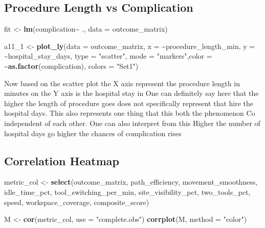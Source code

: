 \documentclass[
]{article}
\newenvironment{Shaded}{\begin{snugshade}}{\end{snugshade}}
\newcommand{\AttributeTok}[1]{\textcolor[rgb]{0.13,0.29,0.53}{#1}}
\newcommand{\FunctionTok}[1]{\textcolor[rgb]{0.13,0.29,0.53}{\textbf{#1}}}
\newcommand{\NormalTok}[1]{#1}
\newcommand{\OtherTok}[1]{\textcolor[rgb]{0.56,0.35,0.01}{#1}}
\newcommand{\SpecialCharTok}[1]{\textcolor[rgb]{0.81,0.36,0.00}{\textbf{#1}}}
\newcommand{\StringTok}[1]{\textcolor[rgb]{0.31,0.60,0.02}{#1}}
\begin{document}
\subsection{Procedure Length vs
Complication}\label{procedure-length-vs-complication}

\begin{Shaded}
\begin{Highlighting}[]
\NormalTok{fit }\OtherTok{\textless{}{-}} \FunctionTok{lm}\NormalTok{(complication}\SpecialCharTok{\textasciitilde{}}\NormalTok{ ., }\AttributeTok{data =}\NormalTok{ outcome\_matrix)}

\NormalTok{a11\_1 }\OtherTok{\textless{}{-}} \FunctionTok{plot\_ly}\NormalTok{(}\AttributeTok{data =}\NormalTok{ outcome\_matrix, }\AttributeTok{x =} \SpecialCharTok{\textasciitilde{}}\NormalTok{procedure\_length\_min, }\AttributeTok{y =} \SpecialCharTok{\textasciitilde{}}\NormalTok{hospital\_stay\_days, }\AttributeTok{type =} \StringTok{"scatter"}\NormalTok{, }\AttributeTok{mode =} \StringTok{"markers"}\NormalTok{,}\AttributeTok{color =} \SpecialCharTok{\textasciitilde{}}\FunctionTok{as.factor}\NormalTok{(complication), }\AttributeTok{colors =} \StringTok{"Set1"}\NormalTok{)}
\end{Highlighting}
\end{Shaded}

Now based on the scatter plot the X axis represent the procedure length
in minutes on the Y axis is the hospital stay in One can definitely say
here that the higher the length of procedure goes does not specifically
represent that hire the hospital days. This also represents one thing
that this both the phenomenon Co independent of each other. One can also
interpret from this Higher the number of hospital days go higher the
chances of complication rises

\subsection{Correlation Heatmap}\label{correlation-heatmap}

\begin{Shaded}
\begin{Highlighting}[]
\NormalTok{metric\_col }\OtherTok{\textless{}{-}} \FunctionTok{select}\NormalTok{(outcome\_matrix,}
\NormalTok{                     path\_efficiency,}
\NormalTok{                     movement\_smoothness,}
\NormalTok{                     idle\_time\_pct,}
\NormalTok{                     tool\_switching\_per\_min,}
\NormalTok{                     site\_visibility\_pct,}
\NormalTok{                     two\_tools\_pct,}
\NormalTok{                     speed,}
\NormalTok{                     workspace\_coverage,}
\NormalTok{                     composite\_score)}

\NormalTok{M }\OtherTok{\textless{}{-}} \FunctionTok{cor}\NormalTok{(metric\_col, }\AttributeTok{use =} \StringTok{"complete.obs"}\NormalTok{)}
\FunctionTok{corrplot}\NormalTok{(M, }\AttributeTok{method =} \StringTok{"color"}\NormalTok{)}
\end{Highlighting}
\end{Shaded}
\end{document}
